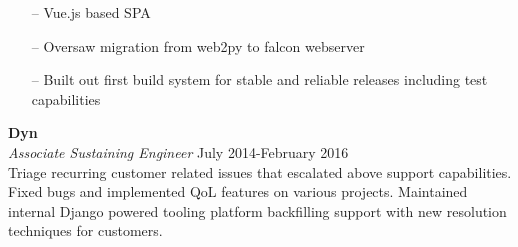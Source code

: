 \begin{minipage}[t]{\linewidth}
    \begin{itemize}
        \item[--] Vue.js based SPA
        \item[--] Oversaw migration from web2py to falcon webserver
        \item[--] Built out first build system for stable and reliable releases including test capabilities
    \end{itemize}
    \end{minipage}

\large{\textbf{Dyn}} \\
\textit{Associate Sustaining Engineer} \hfill July 2014-February 2016 \\[3.75pt]
Triage recurring customer related issues that escalated above support capabilities. Fixed bugs and implemented QoL features on various projects. Maintained internal Django powered tooling platform backfilling support with new resolution techniques for customers.
